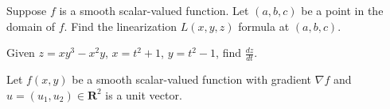 \documentclass[addpoints]{exam}
\begin{document}
\begin{questions}
\question[10] Suppose $f$ is a smooth scalar-valued function. Let $(a,b,c)$ be a point in the domain of $f$. Find the linearization $L(x,y,z)$ formula at $(a,b,c)$. 

\question[25] Given $z = xy^3 - x^2y$, $x = t^2 + 1$, $y = t^2 - 1$, find $\frac{dz}{dt}$. 

\question Let $f(x,y)$ be a smooth scalar-valued function with gradient $\nabla f$ and $u = (u_1,u_2) \in \mathbf{R}^2$ is a unit vector. 


\end{questions}
\end{document}
